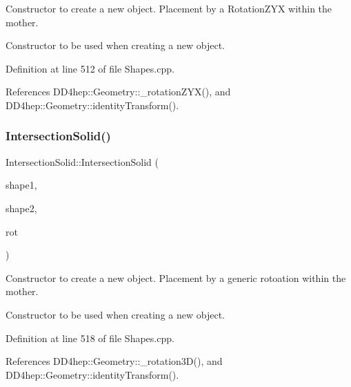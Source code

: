 Constructor to create a new object. Placement by a Rotation\+Z\+YX within the mother. 

Constructor to be used when creating a new object. 

Definition at line 512 of file Shapes.\+cpp.



References D\+D4hep\+::\+Geometry\+::\+\_\+rotation\+Z\+Y\+X(), and D\+D4hep\+::\+Geometry\+::identity\+Transform().

\hypertarget{class_d_d4hep_1_1_geometry_1_1_intersection_solid_ae8220a5808a24ab8bacec490276ace38}{}\label{class_d_d4hep_1_1_geometry_1_1_intersection_solid_ae8220a5808a24ab8bacec490276ace38} 
\subsubsection{\texorpdfstring{Intersection\+Solid()}{IntersectionSolid()}\hspace{0.1cm}{\footnotesize\ttfamily [7/8]}}
{\footnotesize\ttfamily Intersection\+Solid\+::\+Intersection\+Solid (\begin{DoxyParamCaption}\item[{const \hyperlink{namespace_d_d4hep_1_1_geometry_a83de90a8dcc7378ba47d54ef9a6a687b}{Solid} \&}]{shape1,  }\item[{const \hyperlink{namespace_d_d4hep_1_1_geometry_a83de90a8dcc7378ba47d54ef9a6a687b}{Solid} \&}]{shape2,  }\item[{const \hyperlink{namespace_d_d4hep_1_1_geometry_a022fecb763315fa2bf39cbb648944a0e}{Rotation3D} \&}]{rot }\end{DoxyParamCaption})}



Constructor to create a new object. Placement by a generic rotoation within the mother. 

Constructor to be used when creating a new object. 

Definition at line 518 of file Shapes.\+cpp.



References D\+D4hep\+::\+Geometry\+::\+\_\+rotation3\+D(), and D\+D4hep\+::\+Geometry\+::identity\+Transform().

\hypertarget{class_d_d4hep_1_1_geometry_1_1_intersection_solid_a07ed67ab3e7435dc62ecf109475a0d8d}{}\label{class_d_d4hep_1_1_geometry_1_1_intersection_solid_a07ed67ab3e7435dc62ecf109475a0d8d} 
